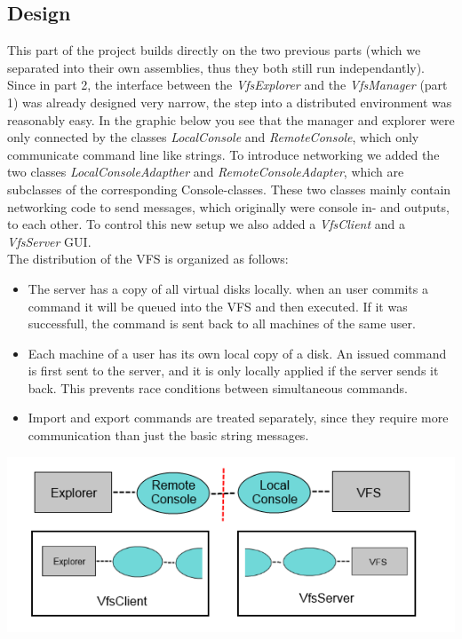 \documentclass[a4paper,12pt]{article}
\begin{document}
\subsection{Design}

This part of the project builds directly on the two previous parts (which we separated into their own assemblies, thus they both still run independantly). Since in part 2, the interface between the \emph{VfsExplorer} and the \emph{VfsManager} (part 1) was already designed very narrow, the step into a distributed environment was reasonably easy. In the graphic below you see that the manager and explorer were only connected by the classes \emph{LocalConsole} and \emph{RemoteConsole}, which only communicate command line like strings. To introduce networking we added the two classes \emph{LocalConsoleAdapther} and \emph{RemoteConsoleAdapter}, which are subclasses of the corresponding Console-classes. These two classes mainly contain networking code to send messages, which originally were console in- and outputs, to each other. To control this new setup we also added a \emph{VfsClient} and a \emph{VfsServer} GUI. \\
The distribution of the VFS is organized as follows:

\begin{itemize}
\item The server has a copy of all virtual disks locally. when an user commits a command it will be queued into the VFS and then executed. If it was successfull, the command is sent back to all machines of the same user.
\item Each machine of a user has its own local copy of a disk. An issued command is first sent to the server, and it is only locally applied if the server sends it back. This prevents race conditions between simultaneous commands.
\item Import and export commands are treated separately, since they require more communication than just the basic string messages.
\end{itemize}


\includegraphics[scale=0.8] {design}
\end{document}
